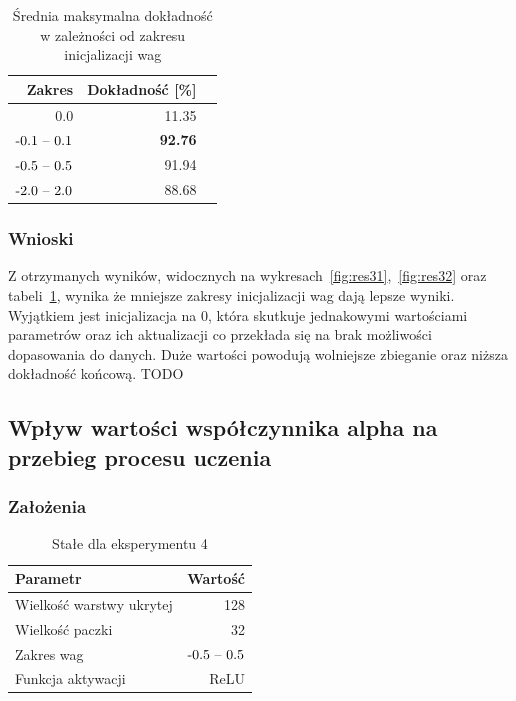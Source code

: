 \documentclass{article}
\begin{document}
\begin{table}[H]
	\caption{Średnia maksymalna dokładność w zależności od zakresu inicjalizacji wag}
	\label{tabela-res-31}
	\centering
	\begin{tabular}{rrr}
		\toprule
		Zakres            & Dokładność [\%] \\
		\midrule
		0.0               & 11.35              \\
		\($-0.1 -- 0.1$\) & \textbf{92.76}     \\
		\($-0.5 -- 0.5$\) & 91.94              \\
		\($-2.0 -- 2.0$\) & 88.68              \\
		\bottomrule
	\end{tabular}
\end{table}

\subsubsection*{Wnioski}

Z otrzymanych wyników, widocznych na wykresach~\ref{fig:res31},~\ref{fig:res32} oraz tabeli~\ref{tabela-res-31}, wynika że mniejsze zakresy inicjalizacji wag dają lepsze wyniki. Wyjątkiem jest inicjalizacja na 0, która skutkuje jednakowymi wartościami parametrów oraz ich aktualizacji co przekłada się na brak możliwości dopasowania do danych. Duże wartości powodują wolniejsze zbieganie oraz niższa dokładność końcową.
TODO

\newpage
\subsection{Wpływ wartości współczynnika alpha na przebieg procesu uczenia}
\subsubsection*{Założenia}
\begin{table}[H]
	\caption{Stałe dla eksperymentu 4}
	\label{tabela-const-4}
	\centering
	\begin{tabular}{lr}
		\toprule
		Parametr                   & Wartość         \\
		\midrule
		Wielkość warstwy ukrytej & 128               \\
		Wielkość paczki          & 32                \\
		Zakres wag                 & \($-0.5 -- 0.5$\) \\
		Funkcja aktywacji          & ReLU              \\
		\bottomrule
	\end{tabular}
\end{table}
\end{document}
